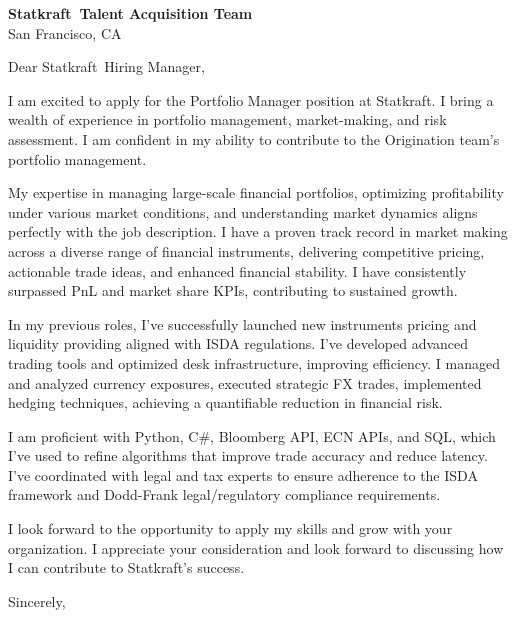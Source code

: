 \documentclass{letter}
\newcommand{\company}{Statkraft}
\begin{document}
\begin{letter}{\textbf{\company\ Talent Acquisition Team} \\                
    San Francisco, CA }

\opening{Dear \company\ Hiring Manager,}

I am excited to apply for the Portfolio Manager position at Statkraft. I bring a wealth of experience in portfolio management, market-making, and risk assessment. I am confident in my ability to contribute to the Origination team's portfolio management.

My expertise in managing large-scale financial portfolios, optimizing profitability under various market conditions, and understanding market dynamics aligns perfectly with the job description. I have a proven track record in market making across a diverse range of financial instruments, delivering competitive pricing, actionable trade ideas, and enhanced financial stability. I have consistently surpassed PnL and market share KPIs, contributing to sustained growth.

In my previous roles, I've successfully launched new instruments pricing and liquidity providing aligned with ISDA regulations. I've developed advanced trading tools and optimized desk infrastructure, improving efficiency. I managed and analyzed currency exposures, executed strategic FX trades, implemented hedging techniques, achieving a quantifiable reduction in financial risk.

I am proficient with Python, C\#, Bloomberg API, ECN APIs, and SQL, which I've used to refine algorithms that improve trade accuracy and reduce latency. I've coordinated with legal and tax experts to ensure adherence to the ISDA framework and Dodd-Frank legal/regulatory compliance requirements.

I look forward to the opportunity to apply my skills and grow with your organization. I appreciate your consideration and look forward to discussing how I can contribute to Statkraft's success.



\closing{Sincerely,}

\end{letter}
\end{document}
